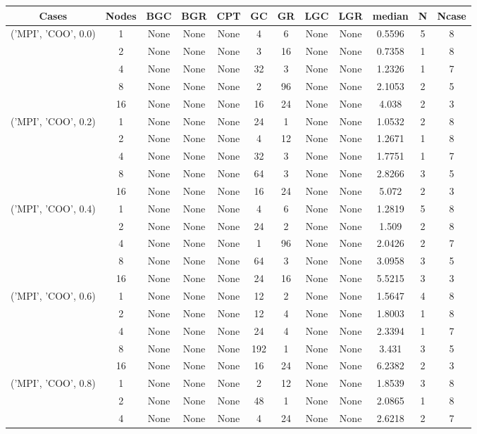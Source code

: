\begin{tabular}{cccccccccccc}
\hline
Cases & Nodes& BGC& BGR& CPT& GC& GR& LGC& LGR& median & N & Ncase \\
\hline
\multirow{5}{*}{('MPI', 'COO', 0.0)}& 1& None& None& None& 4& 6& None& None& 0.5596& 5& 8\\
& 2& None& None& None& 3& 16& None& None& 0.7358& 1& 8\\
& 4& None& None& None& 32& 3& None& None& 1.2326& 1& 7\\
& 8& None& None& None& 2& 96& None& None& 2.1053& 2& 5\\
& 16& None& None& None& 16& 24& None& None& 4.038& 2& 3\\
\hline
\multirow{5}{*}{('MPI', 'COO', 0.2)}& 1& None& None& None& 24& 1& None& None& 1.0532& 2& 8\\
& 2& None& None& None& 4& 12& None& None& 1.2671& 1& 8\\
& 4& None& None& None& 32& 3& None& None& 1.7751& 1& 7\\
& 8& None& None& None& 64& 3& None& None& 2.8266& 3& 5\\
& 16& None& None& None& 16& 24& None& None& 5.072& 2& 3\\
\hline
\multirow{5}{*}{('MPI', 'COO', 0.4)}& 1& None& None& None& 4& 6& None& None& 1.2819& 5& 8\\
& 2& None& None& None& 24& 2& None& None& 1.509& 2& 8\\
& 4& None& None& None& 1& 96& None& None& 2.0426& 2& 7\\
& 8& None& None& None& 64& 3& None& None& 3.0958& 3& 5\\
& 16& None& None& None& 24& 16& None& None& 5.5215& 3& 3\\
\hline
\multirow{5}{*}{('MPI', 'COO', 0.6)}& 1& None& None& None& 12& 2& None& None& 1.5647& 4& 8\\
& 2& None& None& None& 12& 4& None& None& 1.8003& 1& 8\\
& 4& None& None& None& 24& 4& None& None& 2.3394& 1& 7\\
& 8& None& None& None& 192& 1& None& None& 3.431& 3& 5\\
& 16& None& None& None& 16& 24& None& None& 6.2382& 2& 3\\
\hline
\multirow{5}{*}{('MPI', 'COO', 0.8)}& 1& None& None& None& 2& 12& None& None& 1.8539& 3& 8\\
& 2& None& None& None& 48& 1& None& None& 2.0865& 1& 8\\
& 4& None& None& None& 4& 24& None& None& 2.6218& 2& 7\\

\end{tabular}
